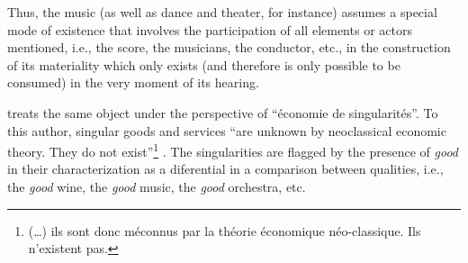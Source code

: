 \documentclass[a4paper, 12pt, openright, oneside, german, french, brazil, english, article]{abntex2}
\begin{document}

	Thus, the music (as well as dance and theater, for instance) assumes a special mode of existence that involves the participation of all elements or actors mentioned, i.e., the score, the musicians, the conductor, etc., in the construction of its materiality which only exists (and therefore is only possible to be consumed) in the very moment of its hearing.	
	

	\cite{karpik2009elements} treats the same object under the perspective of ``économie de singularités''. To this author, singular goods and services ``are unknown by neoclassical economic theory. They do not exist''\footnote{(\dots) ils sont donc méconnus par la théorie économique néo-classique. Ils n'existent pas.} \cite[p. 163]{karpik2009elements}. The singularities are flagged by the presence of \textit{good} in their characterization as a diferential in a comparison between qualities, i.e., the \textit{good} wine, the \textit{good} music, the \textit{good} orchestra, etc. 
	
	
\end{document}
